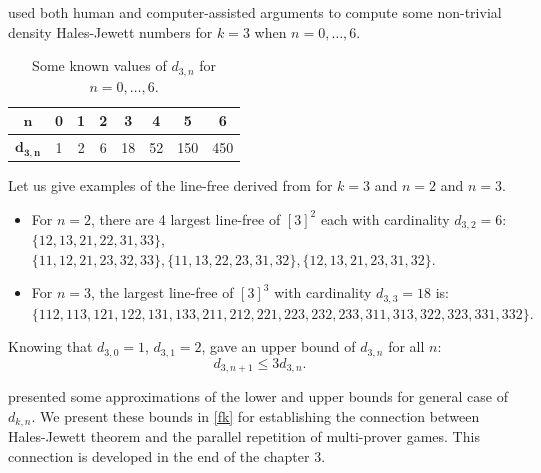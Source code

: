 \cite{polymath2010density} used both human and computer-assisted arguments to compute some non-trivial density Hales-Jewett numbers for $k=3$ when $n= 0,\ldots,6.$

\begin{table}[h]
\centering
\begin{tabular}{|c|c|c|c|c|c|c|c|}
\hline 
$\mathbf{n}$ & 0 & 1 & 2 & 3 & 4 & 5 & 6 \\ 
\hline 
$\mathbf{d_{3,n}}$ & 1 & 2 & 6 & 18 & 52 & 150 & 450 \\ 
\hline 
\end{tabular}
\caption{Some known values of $d_{3,n}$ for $ n= 0,\ldots,6.$}
\end{table} 

Let us give examples of the line-free derived from \cite{polymath2010density} for $k=3$ and $n=2$ and $n=3.$
\begin{itemize}
\item For $n=2$, there are 4 largest line-free of $[3]^2$ each with cardinality $d_{3,2}=6 :$ $ \{12, 13, 21, 22, 31, 33 \}$, $\{11, 12, 21, 23, 32, 33 \}, \{11, 13, 22, 23, 31, 32 \}, \{12, 13, 21, 23, 31, 32 \}.$
\item For $n=3$, the largest line-free of $[3]^3$ with cardinality $d_{3,3}=18$ is: $\{112, 113, 121, 122, 131, 133, 211, 212, 221, 223, 232, 233, 311, 313, 322, 323, 331, 332 \}.$
\end{itemize}

Knowing that $d_{3,0}=1$, $d_{3,1}=2$,  \cite{polymath2010density} gave an upper bound of $d_{3,n}$ for all $n$: $$d_{3,n+1} \leq 3 d_{3,n}.$$

\cite{polymath2010density} presented some approximations of the lower and upper bounds for general case of $d_{k,n}.$ We present these bounds in \eqref{fk} for establishing the connection between Hales-Jewett theorem and the parallel repetition of multi-prover games. This connection is developed in the end of the  chapter 3. 
























